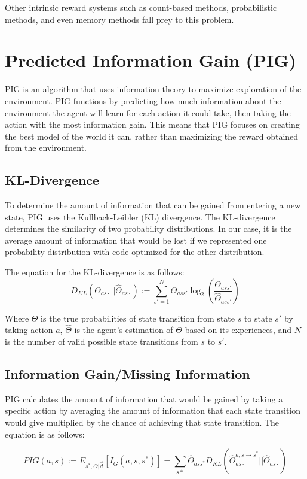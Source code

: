 \documentclass[12pt]{thesis}
\begin{document}
Other intrinsic reward systems such as count-based methods, probabilistic methods, and even memory methods fall prey to this problem.

\section{Predicted Information Gain (PIG)}
PIG is an algorithm that uses information theory to maximize exploration of the environment. PIG functions by predicting how much information about the environment the agent will learn for each action it could take, then taking the action with the most information gain. This means that PIG focuses on creating the best model of the world it can, rather than maximizing the reward obtained from the environment.

\subsection{KL-Divergence}
To determine the amount of information that can be gained from entering a new state, PIG uses the Kullback-Leibler (KL) divergence. The KL-divergence determines the similarity of two probability distributions. In our case, it is the average amount of information that would be lost if we represented one probability distribution with code optimized for the other distribution.

The equation for the KL-divergence is as follows:
\[D_{KL} (\Theta_{as\cdot} || \hat{\Theta}_{as\cdot}) := \sum_{s' = 1}^{ N} \Theta_{ass'} \log_{2}(\frac{\Theta_{ass'}}{\hat{\Theta}_{ass'}})   \]

Where $\Theta$ is the true probabilities of state transition from state $s$ to state $s'$ by taking action $a$, $\hat{\Theta}$ is the agent's estimation of $\Theta$ based on its experiences, and $N$ is the number of valid possible state transitions from $s$ to $s'$.

\subsection{Information Gain/Missing Information}
PIG calculates the amount of information that would be gained by taking a specific action by averaging the amount of information that each state transition would give multiplied by the chance of achieving that state transition. The equation is as follows:

\[ PIG(a,s) := E_{s^{*},\Theta|\vec{d}} [I_{G}(a,s,s^{*})] = \sum_{s*} \hat{\Theta}_{ass^{*}}D_{KL}(\hat{\Theta}_{as\cdot}^{a,s \rightarrow s^{*}} || \hat{\Theta}_{as\cdot}) \]
\end{document}
